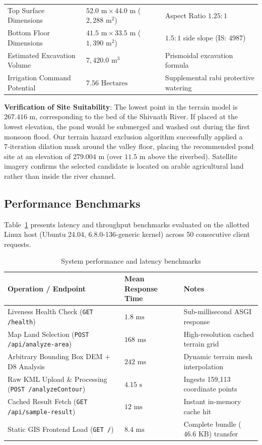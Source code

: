 \documentclass[manuscript,screen,nonacm]{acmart}
\begin{document}
\begin{table}[h]
\begin{tabular}{lll}
    Top Surface Dimensions & $52.0\text{ m} \times 44.0\text{ m}$ ($2,288\text{ m}^2$) & Aspect Ratio $1.25:1$ \\
    Bottom Floor Dimensions & $41.5\text{ m} \times 33.5\text{ m}$ ($1,390\text{ m}^2$) & $1.5:1$ side slope (IS: 4987) \\
    Estimated Excavation Volume & $7,420.0\text{ m}^3$ & Prismoidal excavation formula \\
    Irrigation Command Potential & $7.56\text{ Hectares}$ & Supplemental rabi protective watering \\
    \bottomrule
  \end{tabular}
\end{table}

\noindent \textbf{Verification of Site Suitability}:
The lowest point in the terrain model is $267.416\text{ m}$, corresponding to the bed of the Shivnath River. If placed at the lowest elevation, the pond would be submerged and washed out during the first monsoon flood. Our terrain hazard exclusion algorithm successfully applied a $7\text{-iteration}$ dilation mask around the valley floor, placing the recommended pond site at an elevation of $279.004\text{ m}$ (over $11.5\text{ m}$ above the riverbed). Satellite imagery confirms the selected candidate is located on arable agricultural land rather than inside the river channel.

\subsection{Performance Benchmarks}
Table~\ref{tab:performance} presents latency and throughput benchmarks evaluated on the allotted Linux host (Ubuntu 24.04, 6.8.0-136-generic kernel) across 50 consecutive client requests.

\begin{table}[h]
  \caption{System performance and latency benchmarks}
  \label{tab:performance}
  \begin{tabular}{lll}
    \toprule
    Operation / Endpoint & Mean Response Time & Notes \\
    \midrule
    Liveness Health Check (\texttt{GET /health}) & $1.8\text{ ms}$ & Sub-millisecond ASGI response \\
    Map Land Selection (\texttt{POST /api/analyze-area}) & $168\text{ ms}$ & High-resolution cached terrain grid \\
    Arbitrary Bounding Box DEM + D8 Analysis & $242\text{ ms}$ & Dynamic terrain mesh interpolation \\
    Raw KML Upload \& Processing (\texttt{POST /analyzeContour}) & $4.15\text{ s}$ & Ingests 159,113 coordinate points \\
    Cached Result Fetch (\texttt{GET /api/sample-result}) & $12\text{ ms}$ & Instant in-memory cache hit \\
    Static GIS Frontend Load (\texttt{GET /}) & $8.4\text{ ms}$ & Complete bundle ($46.6\text{ KB}$) transfer \\
    \bottomrule
  \end{tabular}
\end{table}
\end{document}

